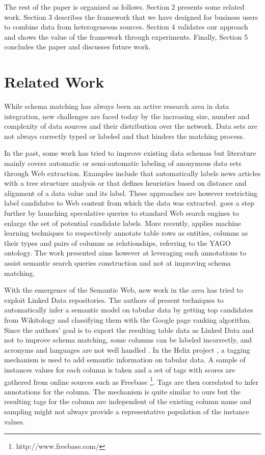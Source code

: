 \documentclass{sig-alternate}
\begin{document}
The rest of the paper is organized as follows. Section 2 presents some related work. Section 3 describes the framework that we have designed for business users to combine data from heterogeneous sources. Section 4 validates our approach and shows the value of the framework through experiments. Finally, Section 5 concludes the paper and discusses future work.


\section{Related Work}

While schema matching has always been an active research area in data integration, new challenges are faced today by the increasing size, number and complexity of data sources and their distribution over the network. Data sets are not always correctly typed or labeled and that hinders the matching process.

In the past, some work has tried to improve existing data schemas \cite{ DBLP:journals/debu/MillerA03} but literature mainly covers automatic or semi-automatic labeling of anonymous data sets through Web extraction. Examples include \cite{cas04} that automatically labels news articles with a tree structure analysis or \cite{wang2003extraction} that defines heuristics based on distance and alignment of a data value and its label. These approaches are however restricting label candidates to Web content from which the data was extracted. \cite{DBLP:conf/otm/SilvaBCS07} goes a step further by launching speculative queries to standard Web search engines to enlarge the set of potential candidate labels. More recently, \cite{Limaye:2010:ASW:1920841.1921005} applies machine learning techniques to respectively annotate table rows as entities, columns as their types and pairs of columns as relationships, referring to the YAGO ontology. The work presented aims however at leveraging such annotations to assist semantic search queries construction and not at improving schema matching. 

With the emergence of the Semantic Web, new work in the area has tried to exploit Linked Data repositories. The authors of \cite{Syed2010Tables} present techniques to automatically infer a semantic model on tabular data by getting top candidates from Wikitology \cite{conf/aaaiss/FininSMMP09} and classifying them with the Google page ranking algorithm. Since the authors' goal is to export the resulting table data as Linked Data and not to improve schema matching, some columns can be labeled incorrectly, and acronyms and languages are not well handled \cite{Syed2010Tables}. In the Helix project \cite{conf/www/HassanzadehDFKSW11}, a tagging mechanism is used to add semantic information on tabular data. A sample of instances values for each column is taken and a set of tags with scores are gathered from online sources such as Freebase \footnote{http://www.freebase.com/}. Tags are then correlated to infer annotations for the column. The mechanism is quite similar to ours but the resulting tags for the column are independent of the existing column name and sampling might not always provide a representative population of the instance values.
\end{document}
